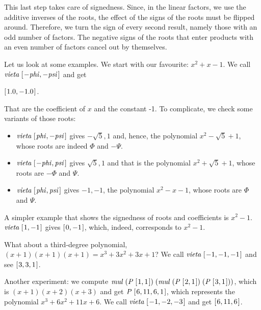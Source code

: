 \documentclass[tikz]{scrreprt}
\newcommand{\Conid}[1]{\mathit{#1}}
\newcommand{\Varid}[1]{\mathit{#1}}
\begin{document}
This last step
takes care of signedness.
Since, in the linear factors, we use the
additive inverses of the roots,
the effect of the signs of the roots
must be flipped around.
Therefore, we turn
the sign of every second result, namely
those with an odd number of factors.
The negative signs of the roots
that enter products with an even number of factors
cancel out by themselves.

Let us look at some examples.
We start with our favourite: $x^2 + x - 1$.
We call \ensuremath{\Varid{vieta}\;[\mskip1.5mu \mathbin{-}\Varid{phi},\mathbin{-}\Varid{psi}\mskip1.5mu]} and get

\ensuremath{[\mskip1.5mu \mathrm{1.0},\mathbin{-}\mathrm{1.0}\mskip1.5mu]}.

That are the coefficient of $x$ and the constant -1.
To complicate, we check some variants of
those roots:

\begin{itemize}
\item \ensuremath{\Varid{vieta}\;[\mskip1.5mu \Varid{phi},\mathbin{-}\Varid{psi}\mskip1.5mu]} gives $-\sqrt{5}, 1$ and, hence, the polynomial
$x^2 - \sqrt{5} + 1$, whose roots are indeed $\Phi$ and $-\Psi$.

\item \ensuremath{\Varid{vieta}\;[\mskip1.5mu \mathbin{-}\Varid{phi},\Varid{psi}\mskip1.5mu]} gives $\sqrt{5}, 1$ and that is the polynomial
$x^2 + \sqrt{5} + 1$, whose roots are $-\Phi$ and $\Psi$.

\item \ensuremath{\Varid{vieta}\;[\mskip1.5mu \Varid{phi},\Varid{psi}\mskip1.5mu]} gives $-1, -1$, the polynomial
$x^2 - x - 1$, whose roots are $\Phi$ and $\Psi$.
\end{itemize}

A simpler example that shows the signedness of roots and coefficients
is $x^2 - 1$. \ensuremath{\Varid{vieta}\;[\mskip1.5mu \mathrm{1},\mathbin{-}\mathrm{1}\mskip1.5mu]} gives \ensuremath{[\mskip1.5mu \mathrm{0},\mathbin{-}\mathrm{1}\mskip1.5mu]}, which, indeed,
corresponds to $x^2  - 1$.

What about a third-degree polynomial,
\eg\ $(x+1)(x+1)(x+1) = x^3 + 3x^2 + 3x + 1$?
We call \ensuremath{\Varid{vieta}\;[\mskip1.5mu \mathbin{-}\mathrm{1},\mathbin{-}\mathrm{1},\mathbin{-}\mathrm{1}\mskip1.5mu]} and see \ensuremath{[\mskip1.5mu \mathrm{3},\mathrm{3},\mathrm{1}\mskip1.5mu]}.

Another experiment: we compute
\ensuremath{\Varid{mul}\;(\Conid{P}\;[\mskip1.5mu \mathrm{1},\mathrm{1}\mskip1.5mu])\;(\Varid{mul}\;(\Conid{P}\;[\mskip1.5mu \mathrm{2},\mathrm{1}\mskip1.5mu])\;(\Conid{P}\;[\mskip1.5mu \mathrm{3},\mathrm{1}\mskip1.5mu]))},
which is $(x+1)(x+2)(x+3)$ and get
\ensuremath{\Conid{P}\;[\mskip1.5mu \mathrm{6},\mathrm{11},\mathrm{6},\mathrm{1}\mskip1.5mu]}, which represents the polynomial
$x^3 + 6x^2 + 11x + 6$.
We call \ensuremath{\Varid{vieta}\;[\mskip1.5mu \mathbin{-}\mathrm{1},\mathbin{-}\mathrm{2},\mathbin{-}\mathrm{3}\mskip1.5mu]} and get \ensuremath{[\mskip1.5mu \mathrm{6},\mathrm{11},\mathrm{6}\mskip1.5mu]}.
\end{document}
